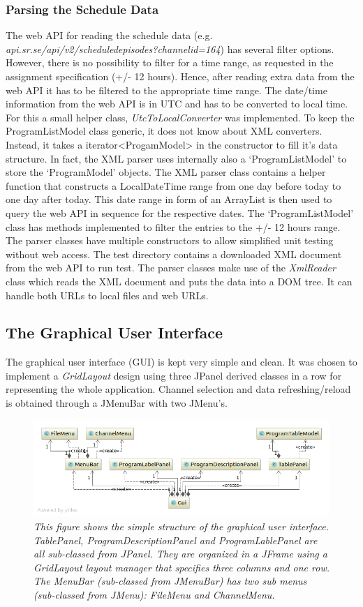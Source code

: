 \documentclass[a4paper,11pt,twoside]{article}
\begin{document}
\subsubsection{Parsing the Schedule Data}
The web API for reading the schedule data (e.g. \textit{api.sr.se/api/v2/scheduledepisodes?channelid=164}) has several filter options. However, there is no possibility to filter for a time range, as requested in the assignment specification (+/- 12 hours). Hence, after reading extra data from the web API it has to be filtered to the appropriate time range. The date/time information from the web API is in UTC and has to be converted to local time. For this a small helper class, \textit{UtcToLocalConverter} was implemented.
To keep the ProgramListModel class generic, it does not know about XML converters. Instead, it takes a iterator<ProgamModel> in the constructor to fill it's data structure. In fact, the XML parser uses internally also a `ProgramListModel' to store the `ProgramModel' objects. The XML parser class contains a helper function that constructs a LocalDateTime range from one day before today to one day after today. This date range in form of an ArrayList is then used to query the web API in sequence for the respective dates. The `ProgramListModel' class has methods implemented to filter the entries to the +/- 12 hours range.
The parser classes have multiple constructors to allow simplified unit testing without web access. The test directory contains a downloaded XML document from the web API to run test. The parser classes make use of the \textit{XmlReader} class which reads the XML document and puts the data into a DOM tree. It can handle both URLs to local files and web URLs.


\subsection{The Graphical User Interface}
The graphical user interface (GUI) is kept very simple and clean. It was chosen to implement a \textit{GridLayout} design using three JPanel derived classes in a row for representing the whole application. Channel selection and data refreshing/reload is obtained through a JMenuBar with two JMenu's.

\begin{figure}[p]
  \centering
  \includegraphics[width=1\textwidth]{guiUML.png}
  \caption{\textit{This figure shows the simple structure of the graphical user interface. TablePanel, ProgramDescriptionPanel and ProgramLablePanel are all sub-classed from JPanel. They are organized in a JFrame using a \textit{GridLayout} layout manager that specifies three columns and one row. The MenuBar (sub-classed from JMenuBar) has two sub menus (sub-classed from JMenu): FileMenu and ChannelMenu.}}
  \label{fig:gui}
\end{figure}
\end{document}
